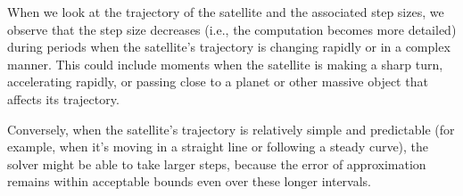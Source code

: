 \documentclass[12pt]{report}
\begin{document}
When we look at the trajectory of the satellite and the associated step sizes, we observe that the step size decreases (i.e., the computation becomes more detailed) during periods when the satellite's trajectory is changing rapidly or in a complex manner. This could include moments when the satellite is making a sharp turn, accelerating rapidly, or passing close to a planet or other massive object that affects its trajectory.

Conversely, when the satellite's trajectory is relatively simple and predictable (for example, when it's moving in a straight line or following a steady curve), the solver might be able to take larger steps, because the error of approximation remains within acceptable bounds even over these longer intervals.
\end{document}
